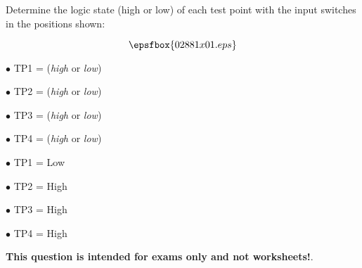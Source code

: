 

Determine the logic state (high or low) of each test point with the input switches in the positions shown:

$$\epsfbox{02881x01.eps}$$

\medskip
\item{$\bullet$} TP1 = ({\it high} or {\it low}) 
\item{$\bullet$} TP2 = ({\it high} or {\it low}) 
\item{$\bullet$} TP3 = ({\it high} or {\it low}) 
\item{$\bullet$} TP4 = ({\it high} or {\it low}) 
\medskip







\medskip
\item{$\bullet$} TP1 = Low
\item{$\bullet$} TP2 = High
\item{$\bullet$} TP3 = High
\item{$\bullet$} TP4 = High
\medskip







{\bf This question is intended for exams only and not worksheets!}.




